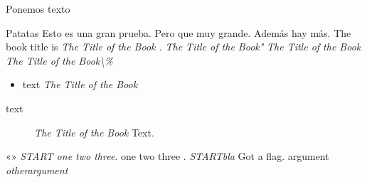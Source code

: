 Ponemos texto

\salto



\lulu

Patatas
Esto es una gran prueba. Pero que muy grande. Además
hay más.
The book title is
\emph{The Title of the Book .}
\emph{The Title of the Book"}
\emph{The Title of the Book}
\emph{The Title of the Book\textbackslash{}\%}
\begin{itemize}
\item text
\emph{The Title of the Book}
\end{itemize}
\begin{description}
\item[text] \emph{The Title of the Book}
Text.
\end{description}
«»
\emph{START one two three}.
one two three .
\emph{START}\emph{bla}
Got a flag.
argument
\emph{otherargument}

